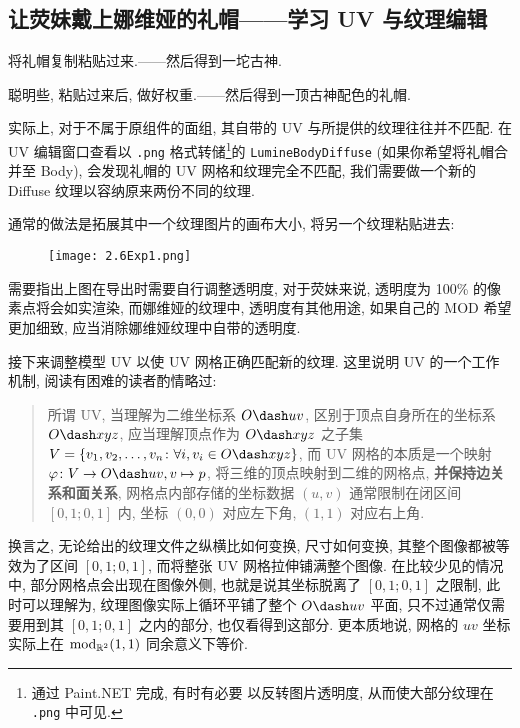         \subsection{让荧妹戴上娜维娅的礼帽——学习 UV 与纹理编辑}
            \par 将礼帽复制粘贴过来.——然后得到一坨古神.
            \par 聪明些, 粘贴过来后, 做好权重.——然后得到一顶古神配色的礼帽.
            \par 实际上, 对于不属于原组件的面组, 其自带的 UV 与所提供的纹理往往并不匹配. 在 UV 编辑窗口查看以 \texttt{.png} 格式转储\footnote{通过 Paint.NET 完成, 有时有必要  以反转图片透明度, 从而使大部分纹理在 \texttt{.png} 中可见.}的  \texttt{LumineBodyDiffuse} (如果你希望将礼帽合并至 Body), 会发现礼帽的 UV 网格和纹理完全不匹配, 我们需要做一个新的 Diffuse 纹理以容纳原来两份不同的纹理.
            \par 通常的做法是拓展其中一个纹理图片的画布大小, 将另一个纹理粘贴进去:
            \begin{figure}[H]
                \centering
                \texttt{[image: 2.6Exp1.png]}
            \end{figure}
            \par 需要指出上图在导出时需要自行调整透明度, 对于荧妹来说, 透明度为 100\% 的像素点将会如实渲染, 而娜维娅的纹理中, 透明度有其他用途, 如果自己的 MOD 希望更加细致, 应当消除娜维娅纹理中自带的透明度.
            \par 接下来调整模型 UV 以使 UV 网格正确匹配新的纹理. 这里说明 UV 的一个工作机制, 阅读有困难的读者酌情略过:
            \begin{quotation}
                {\color{gray}所谓 UV, 当理解为二维坐标系 \(O\dash uv\), 区别于顶点自身所在的坐标系 \(O\dash xyz\), 应当理解顶点作为 \(O\dash xyz\) 之子集 \(V=\{v_1,v_2,\dots,v_n\colon\forall i, v_i\in O\dash xyz\}\), 而 UV 网格的本质是一个映射 \(\varphi\colon V\to O\dash uv, v\mapsto p\), 将三维的顶点映射到二维的网格点, \textbf{并保持边关系和面关系}, 网格点内部存储的坐标数据 \((u,v)\) 通常限制在闭区间 \([0,1;0,1]\) 内, 坐标 \((0,0)\) 对应左下角, \((1,1)\) 对应右上角.}
            \end{quotation}
            换言之, 无论给出的纹理文件之纵横比如何变换, 尺寸如何变换, 其整个图像都被等效为了区间 \([0,1;0,1]\), 而将整张 UV 网格拉伸铺满整个图像. 在比较少见的情况中, 部分网格点会出现在图像外侧, 也就是说其坐标脱离了 \([0,1;0,1]\) 之限制, 此时可以理解为, 纹理图像实际上循环平铺了整个 \(O\dash uv\) 平面, 只不过通常仅需要用到其 \([0,1;0,1]\) 之内的部分, 也仅看得到这部分. 更本质地说, 网格的 \(uv\) 坐标实际上在 \(\operatorname{mod}_{\mathbb{R}^2} (1,1)\) 同余意义下等价.
